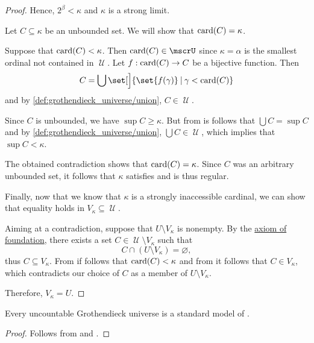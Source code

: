 \begin{proof}
  Hence, \( 2^\beta < \kappa \) and \( \kappa \) is a strong limit.

   Let \( C \subseteq \kappa \) be an unbounded set. We will show that \( \operatorname{card}(C) = \kappa \).

  Suppose that \( \operatorname{card}(C) < \kappa \). Then \( \card(C) \in \mscrU \) since \( \kappa = \alpha \) is the smallest ordinal not contained in \( \mscrU \). Let \( f: \operatorname{card}(C) \to C \) be a bijective function. Then
  \begin{equation*}
    C = \bigcup\set[\Big]{ \set{ f(\gamma) } \given \gamma < \card(C) }
  \end{equation*}
  and by \ref{def:grothendieck_universe/union}, \( C \in \mscrU \).

  Since \( C \) is unbounded, we have \( \sup C \geq \kappa \). But from  is follows that \( \bigcup C = \sup C \) and by \ref{def:grothendieck_universe/union}, \( \bigcup C \in \mscrU \), which implies that \( \sup C < \kappa \).

  The obtained contradiction shows that \( \operatorname{card}(C) = \kappa \). Since \( C \) was an arbitrary unbounded set, it follows that \( \kappa \) satisfies  and is thus regular.

   Finally, now that we know that \( \kappa \) is a strongly inaccessible cardinal, we can show that equality holds in \( V_\kappa \subseteq \mscrU \).

  Aiming at a contradiction, suppose that \( U \setminus V_\kappa \) is nonempty. By the \hyperref[def:zfc/foundation]{axiom of foundation}, there exists a set \( C \in \mscrU \setminus V_\kappa \) such that
  \begin{equation*}
    C \cap (U \setminus V_\kappa) = \varnothing,
  \end{equation*}
  thus \( C \subseteq V_\kappa \). From  if follows that \( \operatorname{card}(C) < \kappa \) and from  it follows that \( C \in V_\kappa \), which contradicts our choice of \( C \) as a member of \( U \setminus V_\kappa \).

  Therefore, \( V_\kappa = U \).
\end{proof}

\begin{corollary}\label{thm:grothendieck_universe_is_model_of_zfc}
  Every uncountable Grothendieck universe is a standard model of \hyperref[def:zfc]{}.
\end{corollary}
\begin{proof}
  Follows from  and .
\end{proof}
